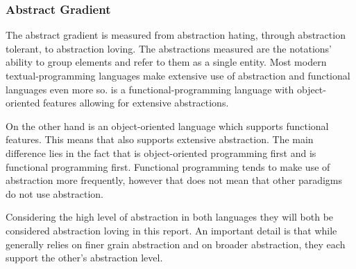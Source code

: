 \subsubsection{Abstract Gradient}
The abstract gradient is measured from abstraction hating, through abstraction tolerant, to abstraction loving. The abstractions measured are the notations' ability to group elements and refer to them as a single entity. Most modern textual-programming languages make extensive use of abstraction and functional languages even more so\cite{hudak1989conception}. \fs is a functional-programming language with object-oriented features allowing for extensive abstractions.

On the other hand \cs is an object-oriented language which supports functional features. This means that \cs also supports extensive abstraction. The main difference lies in the fact that \cs is object-oriented programming first and \fs is functional programming first. Functional programming tends to make use of abstraction more frequently, however that does not mean that other paradigms do not use abstraction\needcite.

Considering the high level of abstraction in both languages they will both be considered abstraction loving in this report. An important detail is that while \fs generally relies on finer grain abstraction and \cs on broader abstraction, they each support the other's abstraction level.
